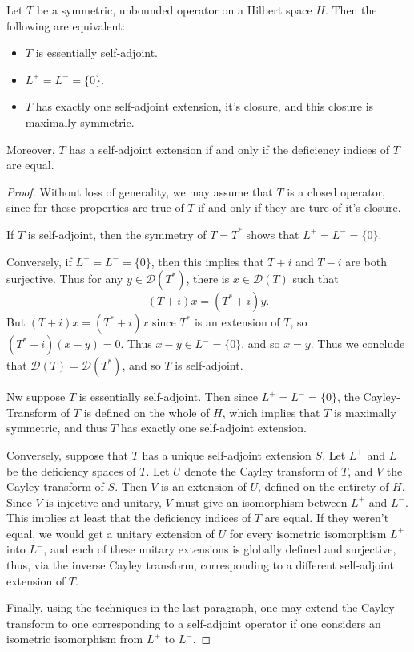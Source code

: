 \begin{theorem}
    Let $T$ be a symmetric, unbounded operator on a Hilbert space $H$. Then the following are equivalent:
    \begin{itemize}
        \item $T$ is essentially self-adjoint.
        \item $L^+ = L^- = \{ 0 \}$.
        \item $T$ has exactly one self-adjoint extension, it's closure, and this closure is maximally symmetric.
    \end{itemize}
    Moreover, $T$ has a self-adjoint extension if and only if the deficiency indices of $T$ are equal.
\end{theorem}
\begin{proof}
    Without loss of generality, we may assume that $T$ is a closed operator, since for these properties are true of $T$ if and only if they are ture of it's closure.

    If $T$ is self-adjoint, then the symmetry of $T = T^*$ shows that $L^+ = L^- = \{ 0 \}$.

    Conversely, if $L^+ = L^- = \{ 0 \}$, then this implies that $T + i$ and $T - i$ are both surjective. Thus for any $y \in \mathcal{D}(T^*)$, there is $x \in \mathcal{D}(T)$ such that
    \[ (T + i)x = (T^* + i)y. \]
    But $(T + i)x = (T^* + i)x$ since $T^*$ is an extension of $T$, so $(T^* + i)(x - y) = 0$. Thus $x - y \in L^- = \{ 0 \}$, and so $x = y$. Thus we conclude that $\mathcal{D}(T) = \mathcal{D}(T^*)$, and so $T$ is self-adjoint.

    Nw suppose $T$ is essentially self-adjoint. Then since $L^+ = L^- = \{ 0 \}$, the Cayley-Transform of $T$ is defined on the whole of $H$, which implies that $T$ is maximally symmetric, and thus $T$ has exactly one self-adjoint extension.

    Conversely, suppose that $T$ has a unique self-adjoint extension $S$. Let $L^+$ and $L^-$ be the deficiency spaces of $T$. Let $U$ denote the Cayley transform of $T$, and $V$ the Cayley transform of $S$. Then $V$ is an extension of $U$, defined on the entirety of $H$. Since $V$ is injective and unitary, $V$ must give an isomorphism between $L^+$ and $L^-$. This implies at least that the deficiency indices of $T$ are equal. If they weren't equal, we would get a unitary extension of $U$ for every isometric isomorphism $L^+$ into $L^-$, and each of these unitary extensions is globally defined and surjective, thus, via the inverse Cayley transform, corresponding to a different self-adjoint extension of $T$.

    Finally, using the techniques in the last paragraph, one may extend the Cayley transform to one corresponding to a self-adjoint operator if one considers an isometric isomorphism from $L^+$ to $L^-$.
\end{proof}

